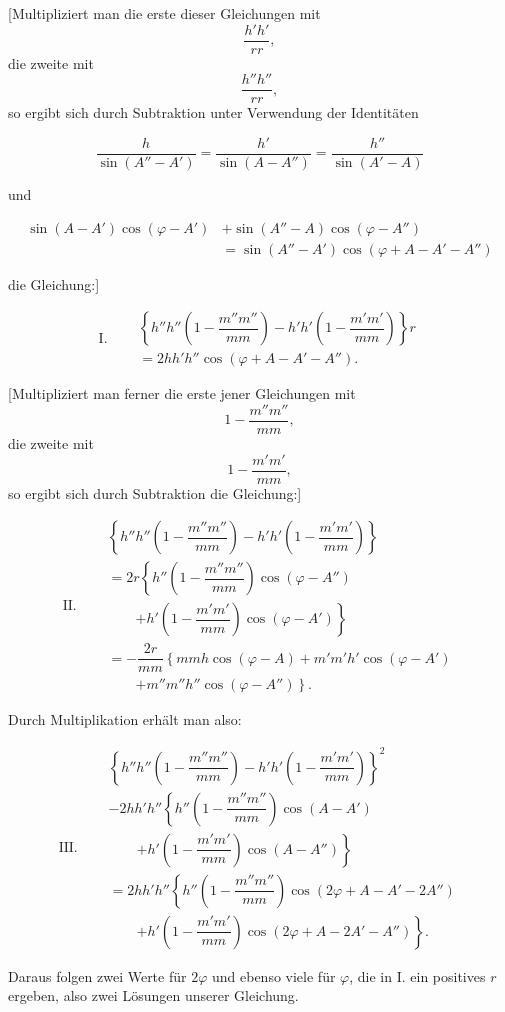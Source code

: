 
[Multipliziert man die erste dieser Gleichungen mit
\[
\dfrac{h'h'}{rr},
\]
die zweite mit
\[
\dfrac{h''h''}{rr},
\]
so ergibt sich durch Subtraktion unter Verwendung der Identitäten

\[
\dfrac{h}{\sin(A''-A')} = \dfrac{h'}{\sin(A-A'')} = \dfrac{h''}{\sin(A'-A)}
\]

und

\[
\begin{aligned}\sin(A-A')\cos(\varphi-A') &+ \sin(A''-A)\cos(\varphi-A'')\\ &= \sin(A''-A')\cos(\varphi+A-A'-A'')\end{aligned}
\]

die Gleichung:]

\[
\mathrm{I.}\quad \begin{aligned}&\left\{h''h''\left(1-\dfrac{m''m''}{mm}\right) - h'h'\left(1-\dfrac{m'm'}{mm}\right)\right\}r \\
&= 2hh'h''\cos(\varphi+A-A'-A'').\end{aligned}
\]

[Multipliziert man ferner die erste jener Gleichungen mit
\[
1 - \dfrac{m''m''}{mm},
\]
die zweite mit
\[
1 - \dfrac{m'm'}{mm},
\]
so ergibt sich durch Subtraktion die Gleichung:]

\[
\mathrm{II.}\quad 
\begin{aligned}
&\left\{h''h''\left(1-\dfrac{m''m''}{mm}\right) - h'h'\left(1-\dfrac{m'm'}{mm}\right)\right\} \\
&= 2r\left\{h''\left(1-\dfrac{m''m''}{mm}\right)\cos(\varphi-A'')\right.\\ &\qquad\left. + h'\left(1-\dfrac{m'm'}{mm}\right)\cos(\varphi-A')\right\}\\
&= -\dfrac{2r}{mm}\left\{mmh\cos(\varphi-A) + m'm'h'\cos(\varphi-A')\right.\\ &\qquad\left. + m''m''h''\cos(\varphi-A'')\right\}.
\end{aligned}
\]

Durch Multiplikation erhält man also:

\[
\mathrm{III.}\quad 
\begin{aligned}
&\left\{h''h''\left(1-\dfrac{m''m''}{mm}\right) - h'h'\left(1-\dfrac{m'm'}{mm}\right)\right\}^2 \\
&- 2hh'h''\left\{h''\left(1-\dfrac{m''m''}{mm}\right)\cos(A-A')\right.\\ &\qquad\left. + h'\left(1-\dfrac{m'm'}{mm}\right)\cos(A-A'')\right\}\\
&= 2hh'h''\left\{h''\left(1-\dfrac{m''m''}{mm}\right)\cos(2\varphi+A-A'-2A'')\right.\\ &\qquad\left. + h'\left(1-\dfrac{m'm'}{mm}\right)\cos(2\varphi+A-2A'-A'')\right\}.
\end{aligned}
\]

Daraus folgen zwei Werte für $2\varphi$ und ebenso viele für $\varphi$, die in I. ein positives $r$ ergeben, also zwei Lösungen unserer Gleichung.
